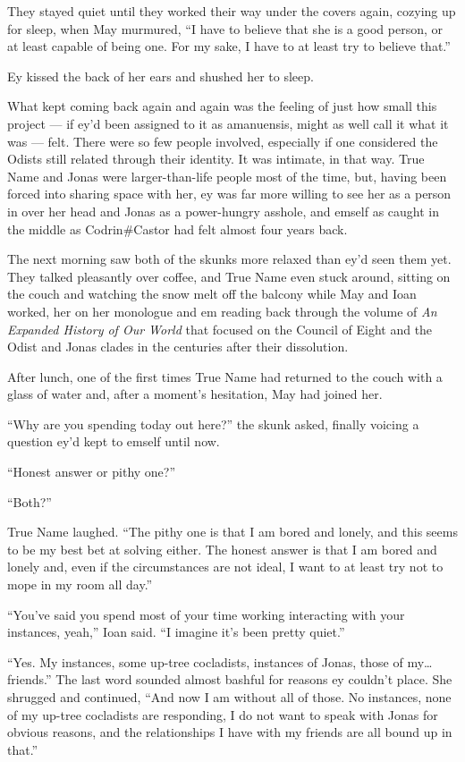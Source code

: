 They stayed quiet until they worked their way under the covers again, cozying up for sleep, when May murmured, ``I have to believe that she is a good person, or at least capable of being one. For my sake, I have to at least try to believe that.''

Ey kissed the back of her ears and shushed her to sleep.

What kept coming back again and again was the feeling of just how small this project — if ey'd been assigned to it as amanuensis, might as well call it what it was — felt. There were so few people involved, especially if one considered the Odists still related through their identity. It was intimate, in that way. True Name and Jonas were larger-than-life people most of the time, but, having been forced into sharing space with her, ey was far more willing to see her as a person in over her head and Jonas as a power-hungry asshole, and emself as caught in the middle as Codrin\#Castor had felt almost four years back.

The next morning saw both of the skunks more relaxed than ey'd seen them yet. They talked pleasantly over coffee, and True Name even stuck around, sitting on the couch and watching the snow melt off the balcony while May and Ioan worked, her on her monologue and em reading back through the volume of \emph{An Expanded History of Our World} that focused on the Council of Eight and the Odist and Jonas clades in the centuries after their dissolution.

After lunch, one of the first times True Name had returned to the couch with a glass of water and, after a moment's hesitation, May had joined her.

``Why are you spending today out here?'' the skunk asked, finally voicing a question ey'd kept to emself until now.

``Honest answer or pithy one?''

``Both?''

True Name laughed. ``The pithy one is that I am bored and lonely, and this seems to be my best bet at solving either. The honest answer is that I am bored and lonely and, even if the circumstances are not ideal, I want to at least try not to mope in my room all day.''

``You've said you spend most of your time working interacting with your instances, yeah,'' Ioan said. ``I imagine it's been pretty quiet.''

``Yes. My instances, some up-tree cocladists, instances of Jonas, those of my\ldots friends.'' The last word sounded almost bashful for reasons ey couldn't place. She shrugged and continued, ``And now I am without all of those. No instances, none of my up-tree cocladists are responding, I do not want to speak with Jonas for obvious reasons, and the relationships I have with my friends are all bound up in that.''

